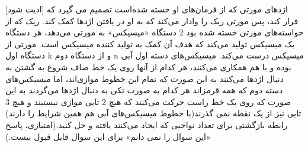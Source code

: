 [ادیت شود]
\p
    اژدهای مورتی که از فرمان‌های او خسته شده‌است تصمیم می گیرد که فرار کند، پس مورتی ریک را وادار می‌کند که به او در یافتن اژدها کمک کند. ریک که از خواسته‌های مورتی خسته شده بود 2 دستگاه «میسیکس» به مورتی می‌دهد، هر دستگاه یک میسیکس تولید می‌کند که هدف آن کمک به تولید کننده میسیکس است. مورتی از دستگاه اول k و از دستگاه دوم n میسیکس درست می‌کند. میسیکس‌های دسته اول آبی بوده و با هم همکاری می‌کنند، هر کدام از آنها روی یک خط صاف شروع به گشتن  به دنبال اژدها می‌کنند به این صورت که تمام این خطوط موازی‌اند، اما میسیکس‌های دسته دوم که همه قرمزاند هر کدام به صورت تکی به دنبال اژدها می‌گردند به این صورت که روی یک خط راست حرکت می‌کنند که هیچ 2 تایی موازی نیستیند و هیچ 3 تایی نیز از یک نقطه نمی گذرند(با خطوط میسیکس‌های آبی هم همین شرایط را دارند) رابطه بازگشتی برای تعداد نواحیی که ایجاد می‌کنند یافته و حل کنید.(امتیازی، پاسخ «این سوال را نمی دانم» برای این سوال قابل قبول نیست.)